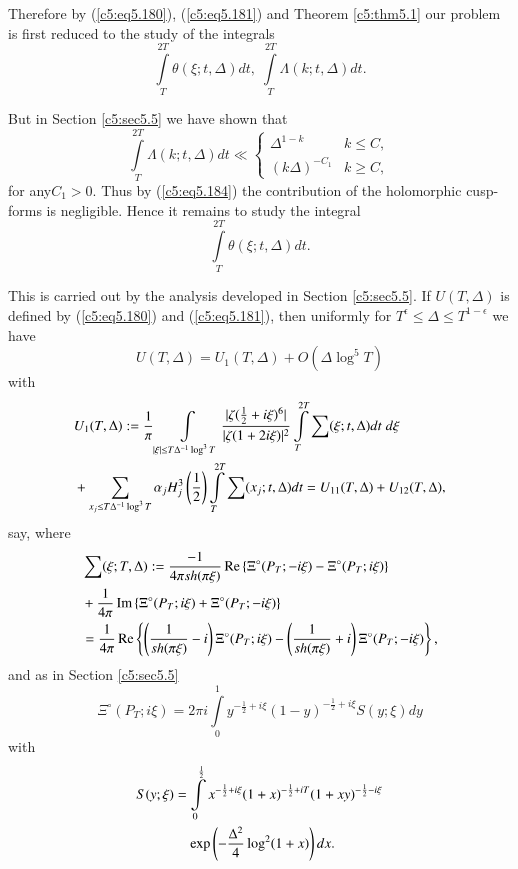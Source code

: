 Therefore by (\ref{c5:eq5.180}), (\ref{c5:eq5.181}) and Theorem
\ref{c5:thm5.1} our problem is first reduced to the study of the
integrals 
$$
\int\limits^{2T}_T \theta (\xi; t,\Delta) dt, \; \int\limits^{2T}_T
\Lambda (k;t,\Delta) dt.  
$$ 

But in Section \ref{c5:sec5.5} we have shown that
\begin{equation}
\int\limits^{2T}_T \Lambda (k;t,\Delta) dt \ll 
\begin{cases}
\Delta^{1-k} &  k \leq C,\\
(k\Delta)^{-C_1} &  k \geq C,
\end{cases}
\label{c5:eq5.184}
\end{equation}
 for any\pageoriginale $C_1 > 0$. Thus by (\ref{c5:eq5.184}) the
 contribution of the holomorphic cusp-forms is negligible. Hence it
 remains to study the integral 
\begin{equation}
\int\limits^{2T}_T \theta (\xi ;t,\Delta) dt. \label{c5:eq5.185}
\end{equation}

This is carried out by the analysis developed in Section
\ref{c5:sec5.5}. If $U(T,\Delta)$ is defined by (\ref{c5:eq5.180}) and
(\ref{c5:eq5.181}), then uniformly for $T^{\epsilon} \leq \Delta \leq
T^{1-\epsilon}$ we have 
\begin{equation}
U(T,\Delta) = U_1(T,\Delta) + O \left(\Delta \log^5 T\right)
\label{c5:eq5.186} 
\end{equation}
with 
\begin{align}
& U_1 (T,\Delta) : = \frac{1}{\pi} \int\limits_{|\xi| \leq T
    \Delta^{-1} \log^3 T} \frac{|\zeta(\frac{1}{2} + i
    \xi)^6|}{|\zeta(1+2i\xi)|^2} \int\limits^{2T}_T \sum(\xi;t,\Delta)
  dt \; d\xi\label{c5:eq5.187}\\ 
&+ \sum\limits_{x_j \leq T \Delta^{-1} \log^3 T} \alpha_j H^3_j
  \left(\frac{1}{2} \right) \int\limits^{2T}_T \sum(x_j ; t, \Delta)
  dt = U_{11} (T,\Delta) + U_{12} (T,\Delta), \notag
\end{align}
say, where 
\begin{align}
& \sum(\xi;T,\Delta) : = \frac{-1}{4 \pi sh (\pi \xi)} \operatorname{Re}
  \left\{\Xi^\circ (P_T; - i \xi) - \Xi^\circ (P_T ; i \xi)
  \right\}\label{c5:eq5.188}\\ 
& + \frac{1}{4 \pi} \operatorname{Im} \left\{ \Xi^\circ (P_T ; i\xi) + \Xi^\circ
  (P_T;-i\xi)\right\}\notag\\ 
& = \frac{1}{4 \pi} \operatorname{Re} \left\{ \left(\frac{1}{sh (\pi \xi) } - i
  \right) \Xi^\circ (P_T ; i \xi) - \left(\frac{1}{sh (\pi \xi)} + i
  \right) \Xi^\circ (P_T ; - i \xi) \right\},\notag 
\end{align}
and as in Section \ref{c5:sec5.5}
\begin{equation}
\Xi^\circ (P_T ; i \xi) = 2 \pi i \int\limits^1_0 y^{-\frac{1}{2} + i
  \xi} (1-y)^{-\frac{1}{2} + i \xi} S (y;\xi) dy
\label{c5:eq5.189} 
\end{equation}
with
\begin{align}
S(y;\xi) &= \int\limits^{\frac{1}{2}}_0 x^{-\frac{1}{2} + i \xi}
(1+x)^{-\frac{1}{2} +iT} (1+xy)^{-\frac{1}{2} - i \xi}\notag\\ 
& \quad \exp
\left(-\frac{\Delta^2}{4} \log^2 (1+x) \right)dx. 
\label{c5:eq5.190}
\end{align}

